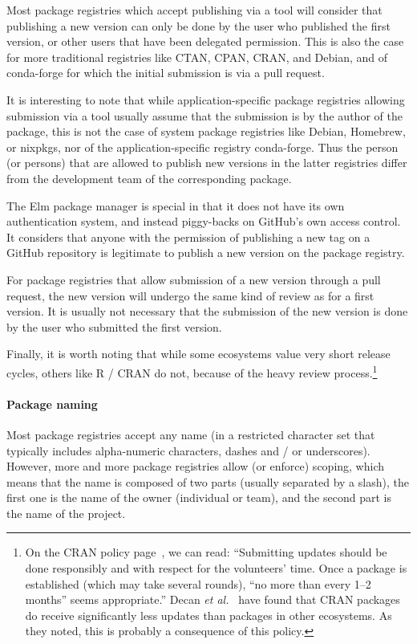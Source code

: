 Most package registries which accept publishing via a tool will consider that publishing a new version can only be done by the user who published the first version, or other users that have been delegated permission.
This is also the case for more traditional registries like CTAN, CPAN, CRAN, and Debian, and of conda-forge for which the initial submission is via a pull request.

It is interesting to note that while application-specific package registries allowing submission via a tool usually assume that the submission is by the author of the package, this is not the case of system package registries like Debian, Homebrew, or nixpkgs, nor of the application-specific registry conda-forge.
Thus the person (or persons) that are allowed to publish new versions in the latter registries differ from the development team of the corresponding package.

The Elm package manager is special in that it does not have its own authentication system, and instead piggy-backs on GitHub's own access control.
It considers that anyone with the permission of publishing a new tag on a GitHub repository is legitimate to publish a new version on the package registry.

For package registries that allow submission of a new version through a pull request, the new version will undergo the same kind of review as for a first version.
It is usually not necessary that the submission of the new version is done by the user who submitted the first version.

Finally, it is worth noting that while some ecosystems value very short release cycles, others like R / CRAN do not, because of the heavy review process.\footnote{
	On the CRAN policy page~\cite{cran_policy}, we can read: ``Submitting updates should be done responsibly and with respect for the volunteers’ time.
	Once a package is established (which may take several rounds), “no more than every 1–2 months” seems appropriate.''
	Decan \emph{et al.}~\cite{decan2019empirical} have found that CRAN packages do receive significantly less updates than packages in other ecosystems.
	As they noted, this is probably a consequence of this policy.
}


\paragraph{Package naming}

Most package registries accept any name (in a restricted character set that typically includes alpha-numeric characters, dashes and / or underscores).
However, more and more package registries allow (or enforce) scoping, which means that the name is composed of two parts (usually separated by a slash), the first one is the name of the owner (individual or team), and the second part is the name of the project.

